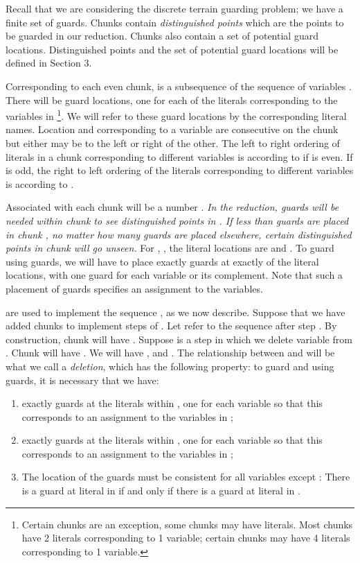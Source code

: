 \documentclass[11pt]{article}
\begin{document}
Recall that we are considering the discrete terrain guarding problem; we have a finite set of guards.  Chunks contain {\em distinguished points} which are the points to be guarded in our reduction.  Chunks also contain a set of potential guard locations.  Distinguished points and the set of potential guard locations will be defined in Section 3.



Corresponding to each even chunk,  is a subsequence  of the sequence of variables .  There will be  guard locations, one for each of the  literals corresponding to the variables in \footnote{Certain chunks are an exception, some chunks may have  literals.  Most chunks have 2 literals corresponding to 1 variable; certain chunks may have 4 literals corresponding to 1 variable.}.  We will refer to these guard locations by the corresponding literal names.  Location  and  corresponding to a variable  are consecutive on the chunk but either may be to the left or right of the other.  The left to right ordering of literals in a chunk  corresponding to different variables is according to  if  is even.  If  is odd, the right to left ordering of the literals corresponding to different variables is according to .

Associated with each chunk  will be a number .  {\em In the reduction,  guards will be needed
within chunk  to see distinguished points in . If less than  guards are placed in chunk , no matter how many guards are placed elsewhere, certain distinguished points in chunk  will go unseen.}  For , , the literal locations are  and .  To guard  using  guards, we will have to place exactly  guards at exactly  of the literal locations,
with one guard for each variable or its complement.  Note that such a placement of guards specifies an assignment to the variables.

 are used to implement the sequence , as we now describe.  Suppose that we have added chunks  to implement steps  of .  Let  refer to the sequence  after step .  By construction, chunk  will have .  Suppose  is a step in which we delete variable  from .  Chunk  will have .  We will have , and .  The relationship between  and  will be what we call a \textit{deletion}, which has the following property: to guard  and  using  guards, it is necessary that we have:

\begin{enumerate}
 \item exactly  guards at the literals within , one for each variable so that this corresponds to an assignment to the variables in ;
 \item exactly  guards at the literals within , one for each variable so that this corresponds to an assignment to the variables in ;
 \item The location of the guards must be consistent for all variables except : There is a guard at literal  in  if and only if there is a guard at literal  in .
\end{enumerate}
\end{document}
